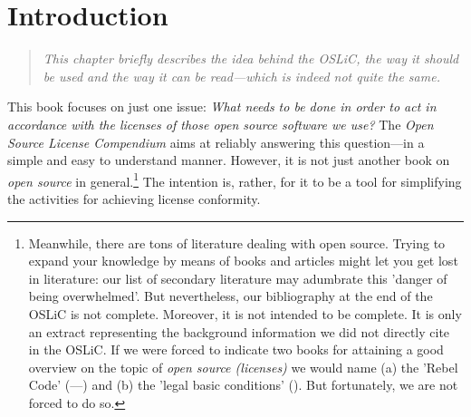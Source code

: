 %
%
%
%
%




\chapter{Introduction}

\footnotesize \begin{quote}\itshape
This chapter briefly describes the idea behind the OSLiC, the way it should be
used and the way it can be read---which is indeed not quite the same.
\end{quote}
\normalsize{}

This book focuses on just one issue: \emph{What needs to be done in order to act
in accordance with the licenses of those \emph{open source software} we use?}
The \emph{Open Source License Compendium} aims at reliably answering this
question---in a simple and easy to understand manner. However, it is not just
another book on \emph{open source} in ge\-ne\-ral.\footnote{Meanwhile, there are
tons of literature dealing with open source. Trying to expand your knowledge by
means of books and articles might let you get lost in literature: our list of
secondary literature may adumbrate this 'danger of being overwhelmed'. But
nevertheless, our bibliography at the end of the OSLiC is not complete.
Moreover, it is not intended to be complete. It is only an extract representing
the background information we did not directly cite in the OSLiC. If we were
forced to indicate two books for attaining a good overview on the topic of
\emph{open source (licenses)} we would name (a) the 'Rebel Code' (\cite[for a
German version cf.][\nopage passim]{Moody2001a}---\cite[for an English version
cf.][passim]{Moody2002a}) and (b) the 'legal basic conditions'
(\cite[cf.][\nopage passim]{JaeMet2011a}). But fortunately, we are not forced to
do so.} The intention is, rather, for it to be a tool for simplifying the
activities for achieving license conformity.

